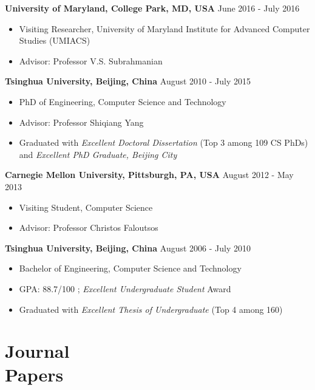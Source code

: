 \documentclass[margin, 10pt]{res} %
\begin{document}
\begin{resume}
{\bf University of Maryland, College Park, MD, USA} \hfill {June 2016 - July 2016}
\begin{itemize} \itemsep -2pt %
	\item Visiting Researcher, University of Maryland Institute for Advanced Computer Studies (UMIACS)
	\item Advisor: Professor V.S. Subrahmanian
\end{itemize}

{\bf Tsinghua University, Beijing, China} \hfill {August 2010 - July 2015}
\begin{itemize} \itemsep -2pt %
\item PhD of Engineering, Computer Science and Technology
\item Advisor: Professor Shiqiang Yang
\item Graduated with {\em Excellent Doctoral Dissertation} (Top 3 among 109 CS PhDs)
	and {\em Excellent PhD Graduate, Beijing City}
\end{itemize}

{\bf Carnegie Mellon University, Pittsburgh, PA, USA} \hfill {August 2012 - May 2013}
\begin{itemize} \itemsep -2pt %
\item Visiting Student, Computer Science
\item Advisor: Professor Christos Faloutsos
\end{itemize}

{\bf Tsinghua University, Beijing, China} \hfill {August 2006 - July 2010}
\begin{itemize} \itemsep -2pt %
\item Bachelor of Engineering, Computer Science and Technology
\item GPA: 88.7/100 %
	; {\em Excellent Undergraduate Student} Award
\item Graduated with {\em Excellent Thesis of Undergraduate} (Top 4 among 160)
\end{itemize}


\section{Journal \\ Papers}


\end{resume}
\end{document}
